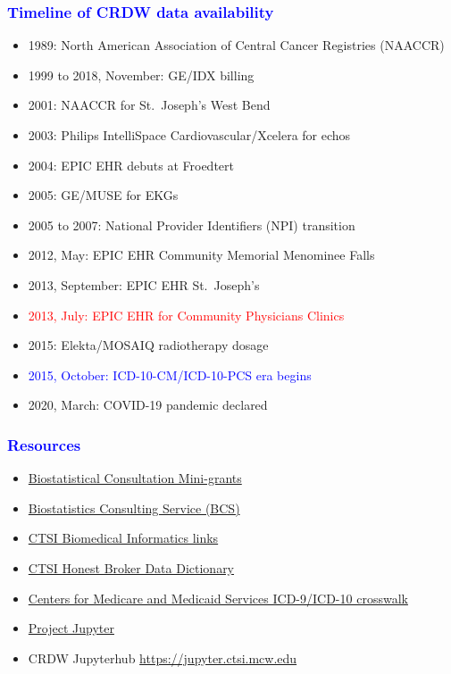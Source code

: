 \documentclass[11pt,pdftex,dvipsnames,usenames]{beamer}
\begin{document}
\begin{frame}[fragile]\frametitle{\bf\textcolor{blue}{Timeline of CRDW data availability}}

\begin{itemize}
\item 1989: North American Association of Central Cancer Registries (NAACCR)
\item 1999 to 2018, November: GE/IDX billing
\item 2001: NAACCR for St.\ Joseph's West Bend
\item 2003: Philips IntelliSpace Cardiovascular/Xcelera for echos
\item 2004: EPIC EHR debuts at Froedtert
\item 2005: GE/MUSE for EKGs
\item 2005 to 2007: National Provider Identifiers (NPI) transition
\item 2012, May: EPIC EHR Community Memorial Menominee Falls
\item 2013, September: EPIC EHR St.\ Joseph's
\item \textcolor{red}{2013, July: EPIC EHR for Community Physicians Clinics} 
\item 2015: Elekta/MOSAIQ radiotherapy dosage
\item \textcolor{blue}{2015, October: ICD-10-CM/ICD-10-PCS era begins}
\item 2020, March: COVID-19 pandemic declared
\end{itemize}

\end{frame}


\begin{frame}[fragile]\frametitle{\bf\textcolor{blue}{Resources}}

\begin{itemize}
\item \href{https://ctsi.mcw.edu/investigator/services/ctsi-mini-grants/biostatistical-consultation}
{Biostatistical Consultation Mini-grants}
\item \href{https://www.mcw.edu/departments/biostatistics/biostatistics-consulting-service}{Biostatistics Consulting Service (BCS)}
\item \href{https://ctri.mcw.edu/resources/bmi-links}{CTSI Biomedical Informatics links}
\item \href{https://ctri.mcw.edu/wp-content/uploads/CTSI-Honest-Broker-Data-Dictionary.pdf}{CTSI Honest Broker Data Dictionary}
\item \href{https://www.nber.org/research/data/icd-9-cm-and-icd-10-cm-and-icd-10-pcs-crosswalk-or-general-equivalence-mappings}
{Centers for Medicare and Medicaid Services ICD-9/ICD-10 crosswalk}
\item \href{https://en.wikipedia.org/wiki/Project_Jupyter}{Project Jupyter}
\item CRDW Jupyterhub \href{https://jupyter.ctsi.mcw.edu}{https://jupyter.ctsi.mcw.edu}
\end{itemize}

\end{frame}
\end{document}
